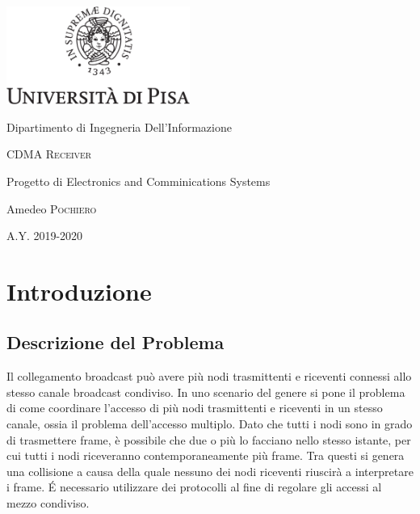 \documentclass[a4paper,12pt]{article}
\newcommand{\projectname}{CDMA Receiver}
\begin{document}
{
  \begin{titlepage}
  	\centering
  	\includegraphics[width=6cm]{img/unipi.pdf}\par
    \vspace{1.5cm}
    {\Large Dipartimento di Ingegneria Dell'Informazione \par}
  	\vspace{1.5cm}
  	{\huge\textsc{\projectname{}}\par}
    \vspace{0.5cm}
    {\Large Progetto di Electronics and Comminications Systems \par}
  	\vspace{2cm}
  	Amedeo \textsc{Pochiero}\par

  	\vfill

  	{\large A.Y. 2019-2020\par}
  \end{titlepage}
}


\clearpage
\tableofcontents
\clearpage
{}

\section{Introduzione} 
  \subsection{Descrizione del Problema}
  Il collegamento broadcast può avere più nodi trasmittenti e riceventi connessi allo stesso canale broadcast condiviso. 
  In uno scenario del genere si pone il problema di come coordinare l'accesso di più nodi trasmittenti e riceventi in un
  stesso canale, ossia il problema dell'accesso multiplo. Dato che tutti i nodi sono in grado di trasmettere
  frame, è possibile che due o più lo facciano nello stesso istante, per cui tutti i nodi riceveranno contemporaneamente
  più frame. Tra questi si genera una collisione a causa della quale nessuno dei nodi riceventi riuscirà a interpretare
  i frame. \'E necessario utilizzare dei protocolli al fine di regolare gli accessi al mezzo condiviso.
\end{document}
